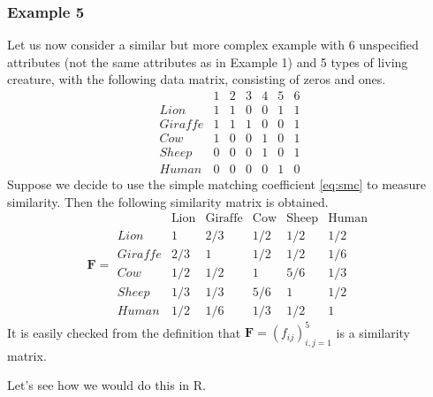\documentclass[
]{book}
\theoremstyle{definition}
\theoremstyle{definition}
\theoremstyle{definition}
\theoremstyle{definition}
\theoremstyle{remark}
\begin{document}
\subsubsection*{Example 5}\label{example-5}

Let us now consider a similar but more complex example with 6 unspecified attributes (not the same attributes as in Example 1) and 5 types of living creature, with the following data matrix, consisting of zeros and ones.
\[
\begin{array}{lcccccc}
&1&2&3&4&5&6\\
Lion&1&1&0&0&1&1\\
Giraffe&1&1&1&0&0&1\\
Cow&1&0&0&1&0&1\\
Sheep&0&0&0&1&0&1\\
Human&0&0&0&0&1&0
\end{array}
\]
Suppose we decide to use the simple matching coefficient \eqref{eq:smc} to measure similarity. Then the following similarity matrix is obtained.
\[
\mathbf F=\begin{array}{lccccc}
&\text{Lion}&\text{Giraffe}&\text{Cow}&\text{Sheep}&\text{Human}\\
Lion&1&2/3&1/2&1/2&1/2\\
Giraffe&2/3&1&1/2&1/2&1/6\\
Cow&1/2&1/2&1&5/6&1/3\\
Sheep&1/3 &1/3 &5/6& 1 &1/2\\
Human&1/2&1/6&1/3&1/2&1
\end{array}
\]
It is easily checked from the definition that \({\mathbf F}=(f_{ij})_{i,j=1}^5\) is a similarity matrix.

Let's see how we would do this in R.
\end{document}
